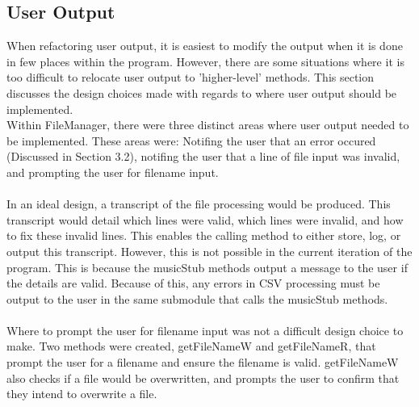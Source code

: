 \documentclass{article}
\begin{document}
	\subsection{User Output}
	When refactoring user output, it is easiest to modify the output when it is done in few places within the program. However, there are some situations where
		it is too difficult to relocate user output to 'higher-level' methods. This section discusses the design choices made with regards to where user output should be implemented.\\
	Within FileManager, there were three distinct areas where user output needed to be implemented. These areas were: Notifing the user that an error occured
		(Discussed in Section 3.2), notifing the user that a line of file input was invalid, and prompting the user for filename input.\\\\
	In an ideal design, a transcript of the file processing would be produced. This transcript would detail which lines were valid, which lines were invalid, and how to fix these invalid lines.
	This enables the calling method to either store, log, or output this transcript.
	However, this is not possible in the current iteration of the program. This is because the musicStub methods output a message to the user if the details are valid.
	Because of this, any errors in CSV processing must be output to the user in the same submodule that calls the musicStub methods.\\\\
	Where to prompt the user for filename input was not a difficult design choice to make. Two methods were created, getFileNameW and getFileNameR, that prompt the user for a
		filename and ensure the filename is valid. getFileNameW also checks if a file would be overwritten, and prompts the user to confirm that they intend to overwrite a file.
\end{document}
